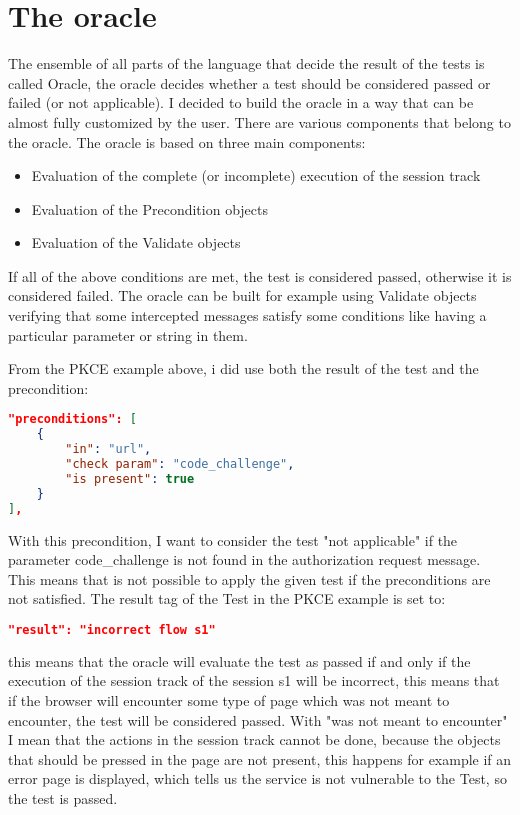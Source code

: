\section{The oracle}
The ensemble of all parts of the language that decide the result of the tests is called Oracle,
the oracle decides whether a test should be considered passed or failed (or not applicable). I decided to build the oracle in a way that can be almost fully customized by the user. There are various components that belong to the oracle. 
The oracle is based on three main components:
\begin{itemize}
    \item Evaluation of the complete (or incomplete) execution of the \gls{session track} 
    \item Evaluation of the Precondition objects
    \item Evaluation of the Validate objects
\end{itemize}
If all of the above conditions are met, the test is considered passed, otherwise it is considered failed.
The oracle can be built for example using Validate objects verifying that some intercepted messages satisfy some conditions like having a particular parameter or string in them.

From the PKCE example above, i did use both the result of the test and the precondition:
\begin{lstlisting}[language=json]
"preconditions": [
    {
        "in": "url",
        "check param": "code_challenge",
        "is present": true
    }
],
\end{lstlisting}
With this precondition, I want to consider the test "not applicable" if the parameter code\_challenge is not found in the authorization request message. This means that is not possible to apply the given test if the preconditions are not satisfied.
The result tag of the Test in the PKCE example is set to:
\begin{lstlisting}[language=json]
"result": "incorrect flow s1"
\end{lstlisting}
this means that the oracle will evaluate the test as passed if and only if the execution of the \gls{session track} of the session s1 will be incorrect, this means that if the browser will encounter some type of page which was not meant to encounter, the test will be considered passed. With "was not meant to encounter" I mean that the actions in the \gls{session track} cannot be done, because the objects that should be pressed in the page are not present, this happens for example if an error page is displayed, which tells us the service is not vulnerable to the Test, so the test is passed.

